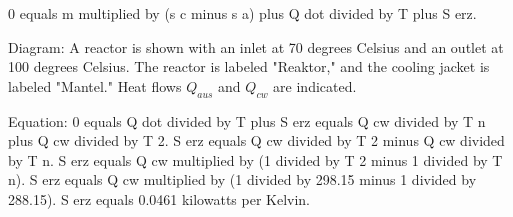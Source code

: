0 equals m multiplied by (s c minus s a) plus Q dot divided by T plus S erz.  

Diagram:  
A reactor is shown with an inlet at 70 degrees Celsius and an outlet at 100 degrees Celsius. The reactor is labeled "Reaktor," and the cooling jacket is labeled "Mantel." Heat flows \( Q_{aus} \) and \( Q_{cw} \) are indicated.  

Equation:  
0 equals Q dot divided by T plus S erz equals Q cw divided by T n plus Q cw divided by T 2.  
S erz equals Q cw divided by T 2 minus Q cw divided by T n.  
S erz equals Q cw multiplied by (1 divided by T 2 minus 1 divided by T n).  
S erz equals Q cw multiplied by (1 divided by 298.15 minus 1 divided by 288.15).  
S erz equals 0.0461 kilowatts per Kelvin.